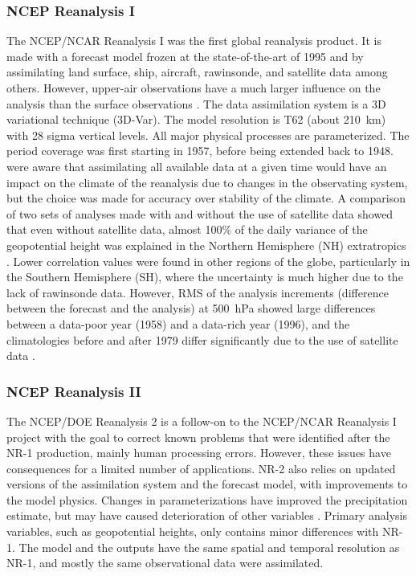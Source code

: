\documentclass{ametsoc}
\begin{document}
\subsubsection{NCEP Reanalysis I}

The NCEP/NCAR Reanalysis I \citep[NR-1,][]{Kalnay1996, Kistler2001} was the first global reanalysis product. It is made with a forecast model frozen at the state-of-the-art of 1995 and by assimilating land surface, ship, aircraft, rawinsonde, and satellite data among others. However, upper-air observations have a much larger influence on the analysis than the surface observations \citep{Kistler2001}. The data assimilation system is a 3D variational technique (3D-Var). The model resolution is T62 (about 210~km) with 28 sigma vertical levels. All major physical processes are parameterized. The period coverage was first starting in 1957, before being extended back to 1948. \citet{Kalnay1996} were aware that assimilating all available data at a given time would have an impact on the climate of the reanalysis due to changes in the observating system, but the choice was made for accuracy over stability of the climate. A comparison of two sets of analyses made with and without the use of satellite data showed that even without satellite data, almost 100\% of the daily variance of the geopotential height was explained in the Northern Hemisphere (NH) extratropics \citep{Kalnay1996}. Lower correlation values were found in other regions of the globe, particularly in the Southern Hemisphere (SH), where the uncertainty is much higher due to the lack of rawinsonde data. However, RMS of the analysis increments (difference between the forecast and the analysis) at 500~hPa showed large differences between a data-poor year (1958) and a data-rich year (1996), and the climatologies before and after 1979 differ significantly due to the use of satellite data \citep{Kistler2001}.


\subsubsection{NCEP Reanalysis II}

The NCEP/DOE Reanalysis 2 \citep[NR-2,][]{Kanamitsu2002} is a follow-on to the NCEP/NCAR Reanalysis I project with the goal to correct known problems that were identified after the NR-1 production, mainly human processing errors. However, these issues have consequences for a limited number of applications. NR-2 also relies on updated versions of the assimilation system and the forecast model, with improvements to the model physics. Changes in parameterizations have improved the precipitation estimate, but may have caused deterioration of other variables \citep{Kistler2001, Kanamitsu2002}. Primary analysis variables, such as geopotential heights, only contains minor differences with NR-1. The model and the outputs have the same spatial and temporal resolution as NR-1, and mostly the same observational data were assimilated.
\end{document}
